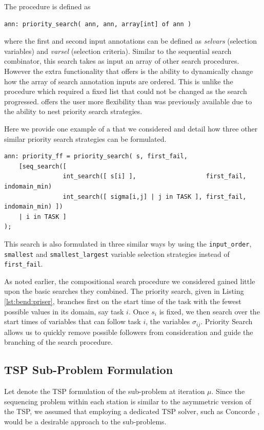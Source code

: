 The \priser procedure is defined as
\begin{lstlisting}[language=minizinc]
ann: priority_search( ann, ann, array[int] of ann )
\end{lstlisting}%
where the first and second input annotations
can be defined as \emph{selvars} (selection variables)
and \emph{varsel} (selection criteria).
Similar to the sequential search combinator, this search
takes as input an array of other search procedures.
However the extra functionality that \priser
offers is the ability to dynamically change how
the array of search annotation inputs are ordered.
This is unlike the \seqser procedure which required
a fixed list that could not be changed as the search
progressed.
\priser offers the user more flexibility than was previously
available due to the ability to nest priority search strategies.

Here we provide one example of a \priser
that we considered and detail how three other similar
priority search strategies can be formulated.
\begin{lstlisting}[caption={Priority search used for CP sub-problems},label={lst:bend:priser},language=minizinc]
ann: priority_ff = priority_search( s, first_fail,
    [seq_search([
                int_search([ s[i] ],                   first_fail, indomain_min)
                int_search([ sigma[i,j] | j in TASK ], first_fail, indomain_min) ])
    | i in TASK ]
);
\end{lstlisting}\vspace{5mm}
This search is also formulated in three similar ways by
using the {\tt input\_order}, {\tt smallest} and {\tt smallest\_largest}
variable selection strategies instead of {\tt first\_fail}.

As noted earlier, the compositional search
procedure we considered gained little upon the basic
searches they combined.
The priority search, given in Listing \ref{lst:bend:priser},
branches first on the start time of the task
with the fewest possible values in its domain, say task $i$. 
Once $s_i$ is fixed, we then search over the
start times of variables that can follow task $i$,
\ie the variables $\sigma_{ij}$.
Priority Search allows us to quickly remove
possible followers from consideration and guide the
branching of the search procedure.


\subsection{TSP Sub-Problem Formulation}
\label{sec:bend:TSP}
Let \sptsp{\mu} denote the TSP
formulation of the sub-problem at iteration $\mu$.
Since the sequencing problem within each station is similar to the 
asymmetric version of the TSP, we assumed that
employing a dedicated TSP solver, such as Concorde \cite{Applegate2017},
would be a desirable approach to the sub-problems.

